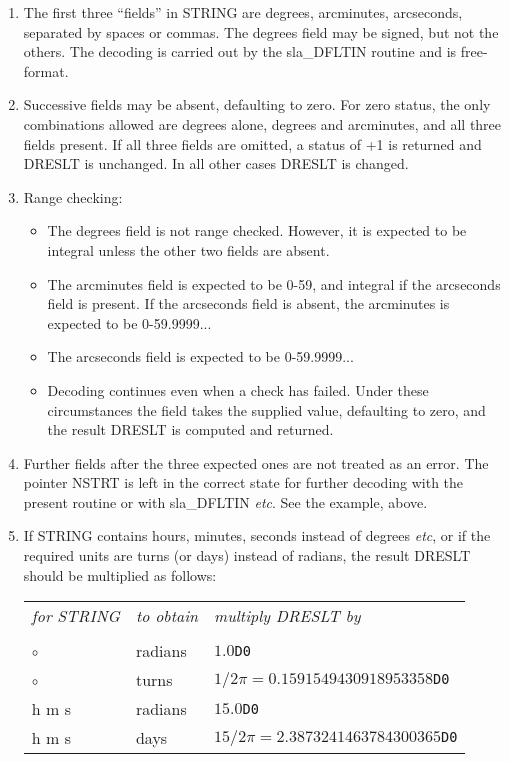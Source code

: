 \setlength{\topsep}{\oldspacing}
\notes
{
 \begin{enumerate}
  \item The first three ``fields'' in STRING are degrees, arcminutes,
   arcseconds, separated by spaces or commas.  The degrees field
   may be signed, but not the others.  The decoding is carried
   out by the sla\_DFLTIN routine and is free-format.
  \item Successive fields may be absent, defaulting to zero.  For
   zero status, the only combinations allowed are degrees alone,
   degrees and arcminutes, and all three fields present.  If all
   three fields are omitted, a status of +1 is returned and DRESLT is
   unchanged.  In all other cases DRESLT is changed.
  \item Range checking:
   \begin{itemize}
    \item The degrees field is not range checked.  However, it is
     expected to be integral unless the other two fields are absent.
    \item The arcminutes field is expected to be 0-59, and integral if
     the arcseconds field is present.  If the arcseconds field
     is absent, the arcminutes is expected to be 0-59.9999...
    \item The arcseconds field is expected to be 0-59.9999...
    \item Decoding continues even when a check has failed.  Under these
     circumstances the field takes the supplied value, defaulting to
     zero, and the result DRESLT is computed and returned.
   \end{itemize}
   \item Further fields after the three expected ones are not treated as
    an error.  The pointer NSTRT is left in the correct state for
    further decoding with the present routine or with sla\_DFLTIN
    {\it etc}.  See the example, above.
   \item If STRING contains hours, minutes, seconds instead of
    degrees {\it etc},
    or if the required units are turns (or days) instead of radians,
    the result DRESLT should be multiplied as follows: \\ [1.5ex]
    \begin{tabular}{p{7em}p{7em}p{20em}}
    {\it for STRING} & {\it to obtain} & {\it multiply DRESLT by} \\ \\
    ${\circ}$~~\raisebox{-0.7ex}{$'$}~~\raisebox{-0.7ex}{$''$}
     & radians & $1.0$\verb|D0| \\
    ${\circ}$~~\raisebox{-0.7ex}{$'$}~~\raisebox{-0.7ex}{$''$}
     & turns & $1/{2 \pi} = 0.1591549430918953358$\verb|D0| \\
    h m s & radians & $15.0$\verb|D0| \\
    h m s & days & $15/{2\pi} = 2.3873241463784300365$\verb|D0|
   \end{tabular}
 \end{enumerate}
}
